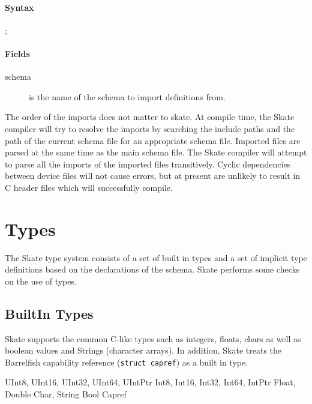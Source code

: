 \documentclass[a4paper,11pt,twoside]{report}
\begin{document}
{{\paragraph{Syntax}

\begin{syntax}
 ;
\end{syntax}

\paragraph{Fields}

\begin{description}
\item[schema] is the name of the schema to import definitions from.  
\end{description}

The order of the imports does not matter to skate. At compile time, the Skate 
compiler will try to resolve the imports by searching the include paths and the 
path of the current schema file for an appropriate schema file. Imported files 
are parsed at the same time as the main schema file. The Skate compiler will 
attempt to parse all the imports of the imported files transitively. Cyclic 
dependencies between device files will not cause errors, but at present are 
unlikely to result in C header files which will successfully compile. 

\section{Types}\label{sec:decl:types}

The Skate type system consists of a set of built in types and a set of implicit 
type definitions based on the declarations of the schema. Skate performs some
checks on the use of types.

\subsection{BuiltIn Types}

Skate supports the common C-like types such as integers, floats, chars as well 
as boolean values and Strings (character arrays). In addition, Skate treats
the Barrelfish capability reference (\texttt{struct capref}) as a built in 
type.

\begin{syntax}
    UInt8, UInt16, UInt32, UInt64, UIntPtr
    Int8, Int16, Int32, Int64, IntPtr
    Float, Double
    Char, String
    Bool
    Capref
\end{syntax}


}}
\end{document}
